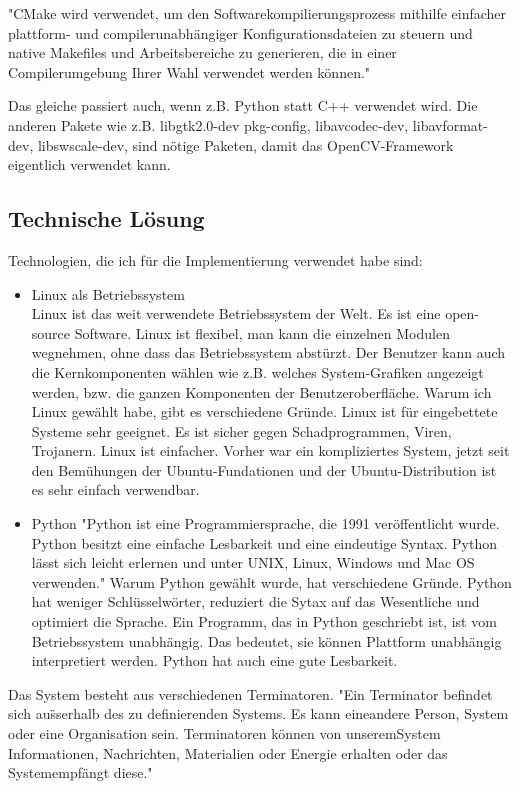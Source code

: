 "CMake wird verwendet, um den Softwarekompilierungsprozess mithilfe einfacher plattform- und compilerunabh\"angiger Konfigurationsdateien zu steuern und native Makefiles und Arbeitsbereiche zu generieren, die in einer Compilerumgebung Ihrer Wahl verwendet werden k\"onnen."\cite{cmake}

Das gleiche passiert auch, wenn z.B. Python statt C++ verwendet wird. Die anderen Pakete wie z.B. libgtk2.0-dev pkg-config, libavcodec-dev, libavformat-dev, libswscale-dev, sind n\"otige Paketen, damit das OpenCV-Framework eigentlich verwendet kann. 
 \subsection{Technische L\"osung}
Technologien, die ich f\"ur die Implementierung verwendet habe sind: 
\begin{itemize}
	\item Linux als Betriebssystem \cite{Linux_Betriebssystem}  \\
	Linux ist das weit verwendete Betriebssystem der Welt. Es ist eine open-source Software. Linux ist flexibel, man kann die einzelnen Modulen wegnehmen, ohne dass das Betriebssystem abst\"urzt. Der Benutzer kann auch die Kernkomponenten w\"ahlen wie z.B. welches System-Grafiken angezeigt werden, bzw. die ganzen Komponenten der Benutzeroberfl\"ache. Warum ich Linux gew\"ahlt habe, gibt es verschiedene Gr\"unde. Linux ist f\"ur eingebettete Systeme sehr geeignet. Es ist sicher gegen Schadprogrammen, Viren, Trojanern. Linux ist einfacher. Vorher war ein kompliziertes System, jetzt seit den Bem\"uhungen der Ubuntu-Fundationen und der Ubuntu-Distribution ist es sehr einfach verwendbar.\\
	\item Python
	"Python ist eine Programmiersprache, die 1991 ver\"offentlicht wurde. Python besitzt eine einfache Lesbarkeit und eine eindeutige Syntax. Python l\"asst sich leicht erlernen und unter UNIX, Linux, Windows und Mac OS verwenden." \cite{python} Warum Python gew\"ahlt wurde, hat verschiedene Gr\"unde. Python hat weniger Schl\"usselw\"orter, reduziert die Sytax auf das Wesentliche und optimiert die Sprache. Ein Programm, das in Python geschriebt ist, ist vom Betriebssystem unabh\"angig. Das bedeutet, sie k\"onnen Plattform unabh\"angig interpretiert werden. Python hat auch eine gute Lesbarkeit. \\ 
	
	
\end{itemize}
Das System besteht aus verschiedenen Terminatoren.
"Ein  Terminator  befindet  sich  au\"sserhalb  des  zu  definierenden  Systems.  Es  kann  eineandere Person, System oder eine Organisation sein. Terminatoren k\"onnen von unseremSystem Informationen, Nachrichten, Materialien oder Energie erhalten oder das Systemempf\"angt diese."\cite{terminator}

